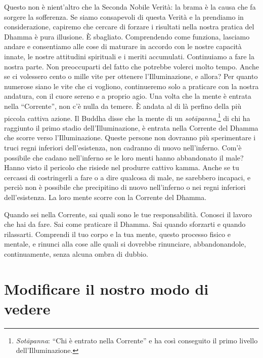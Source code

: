 Questo non è nient'altro che la Seconda Nobile Verità: la brama è la
causa che fa sorgere la sofferenza. Se siamo consapevoli di questa
Verità e la prendiamo in considerazione, capiremo che cercare di forzare
i risultati nella nostra pratica del Dhamma è pura illusione. È
sbagliato. Comprendendo come funziona, lasciamo andare e consentiamo
alle cose di maturare in accordo con le nostre capacità innate, le
nostre attitudini spirituali e i meriti accumulati. Continuiamo a fare
la nostra parte. Non preoccuparti del fatto che potrebbe volerci molto
tempo. Anche se ci volessero cento o mille vite per ottenere
l'Illuminazione, e allora? Per quanto numerose siano le vite che ci
vogliono, continueremo solo a praticare con la nostra andatura, con il
cuore sereno e a proprio agio. Una volta che la mente è entrata nella
``Corrente'', non c'è nulla da temere. È andata al di là perfino della
più piccola cattiva azione. Il Buddha disse che la mente di un
\emph{sotāpanna},\footnote{\emph{Sotāpanna}: ``Chi è entrato nella
  Corrente'' e ha così conseguito il primo livello dell'Illuminazione.}
di chi ha raggiunto il primo stadio dell'Illuminazione, è entrata nella
Corrente del Dhamma che scorre verso l'Illuminazione. Queste persone non
dovranno più sperimentare i truci regni inferiori dell'esistenza, non
cadranno di nuovo nell'inferno. Com'è possibile che cadano nell'inferno
se le loro menti hanno abbandonato il male? Hanno visto il pericolo che
risiede nel produrre cattivo kamma. Anche se tu cercassi di
costringerli a fare o a dire qualcosa di male, ne sarebbero incapaci, e
perciò non è possibile che precipitino di nuovo nell'inferno o nei
regni inferiori dell'esistenza. La loro mente scorre con la Corrente del
Dhamma.

Quando sei nella Corrente, sai quali sono le tue responsabilità. Conosci
il lavoro che hai da fare. Sai come praticare il Dhamma. Sai quando
sforzarti e quando rilassarti. Comprendi il tuo corpo e la tua mente,
questo processo fisico e mentale, e rinunci alla cose alle quali si
dovrebbe rinunciare, abbandonandole, continuamente, senza alcuna ombra
di dubbio.

\section{Modificare il nostro modo di vedere}

